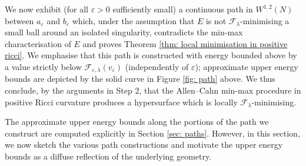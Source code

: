 \documentclass[11pt]{article}
\begin{document}
We now exhibit (for all $\varepsilon > 0$ sufficiently small) a continuous path in $W^{1,2}(N)$ between $a_\varepsilon$ and $b_\varepsilon$ which, under the assumption that $E$ is not $\mathcal{F}_\lambda$-minimising a small ball around an isolated singularity, contradicts the min-max characterisation of $E$ and proves Theorem \ref{thm: local minimisation in positive ricci}. We emphasise that this path is constructed with energy bounded above by a value strictly below $\mathcal{F}_{\varepsilon,\lambda}(v_\varepsilon)$ (independently of $\varepsilon$); approximate upper energy bounds are depicted by the solid curve in Figure \ref{fig: path} above. We thus conclude, by the arguments in Step 2, that the Allen--Cahn min-max procedure in positive Ricci curvature produces a hypersurface which is locally $\mathcal{F}_\lambda$-minimising.

\bigskip

The approximate upper energy bounds along the portions of the path we construct are computed explicitly in Section \ref{sec: paths}. However, in this section, we now sketch the various path constructions and motivate the upper energy bounds as a diffuse reflection of the underlying geometry.

\bigskip
\end{document}
